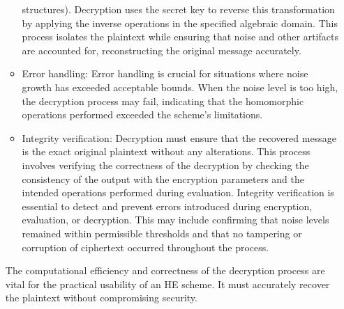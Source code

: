 \documentclass[
  letterpaper,
  DIV=11,
  numbers=noendperiod,
  oneside]{scrartcl}
\begin{document}
\begin{itemize}
\begin{itemize}
    structures). Decryption uses the secret key to reverse this
    transformation by applying the inverse operations in the specified
    algebraic domain. This process isolates the plaintext while ensuring
    that noise and other artifacts are accounted for, reconstructing the
    original message accurately.
  \item
    Error handling: Error handling is crucial for situations where noise
    growth has exceeded acceptable bounds. When the noise level is too
    high, the decryption process may fail, indicating that the
    homomorphic operations performed exceeded the scheme's limitations.
  \item
    Integrity verification: Decryption must ensure that the recovered
    message is the exact original plaintext without any alterations.
    This process involves verifying the correctness of the decryption by
    checking the consistency of the output with the encryption
    parameters and the intended operations performed during evaluation.
    Integrity verification is essential to detect and prevent errors
    introduced during encryption, evaluation, or decryption. This may
    include confirming that noise levels remained within permissible
    thresholds and that no tampering or corruption of ciphertext
    occurred throughout the process.
  \end{itemize}

  The computational efficiency and correctness of the decryption process
  are vital for the practical usability of an HE scheme. It must
  accurately recover the plaintext without compromising security.
\end{itemize}
\end{document}
